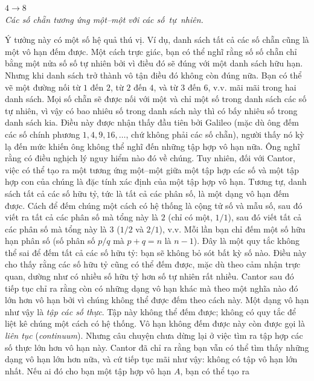 \begin{multicols}{2}
\begin{center}
		$4 \longrightarrow 8$\\
		\vskip 0.05cm
		\textit{\small\color{quantoan}Các số chẵn tương ứng một--một với các số~tự~nhiên.}
	\end{center}
	Ý tưởng này có một số hệ quả thú vị. Ví dụ, danh sách tất cả các số chẵn cũng
	là một vô hạn đếm được. Một cách trực giác, bạn có thể nghĩ rằng số số chẵn
	chỉ bằng một nửa số số tự nhiên bởi vì điều đó sẽ đúng với một danh sách hữu hạn.
	Nhưng khi danh sách trở thành vô tận điều đó không còn đúng nữa. Bạn có thể vẽ
	một đường nối từ $1$ đến $2$, từ $2$ đến $4$, và từ $3$ đến $6$, v.v. mãi
	mãi trong hai danh sách. Mọi số chẵn sẽ được nối với một và chỉ một số trong
	danh sách các số tự nhiên, vì vậy có bao nhiêu số trong danh sách này thì có
	bấy nhiêu 
	số trong danh sách kia. Điều này được nhận thấy đầu tiên bởi Galileo
	(mặc dù ông đếm các số chính phương $1, 4, 9, 16, \ldots$, chứ không phải các số
	chẵn), người thấy nó kỳ lạ đến mức khiến ông không thể nghĩ đến những tập
	hợp vô hạn nữa.  Ông nghĩ rằng có điều nghịch lý nguy hiểm nào đó về
	chúng. Tuy nhiên, đối với Cantor, việc có thể tạo ra một tương ứng một--một
	giữa một tập hợp các số và một tập hợp con của chúng là đặc tính xác định của
	một tập hợp vô hạn.
	\vskip 0.05cm 
	Tương tự, danh sách tất cả các số hữu tỷ, tức là tất cả các phân số, là một
	dạng vô hạn đếm được. Cách để đếm chúng một cách có hệ thống là cộng tử số và
	mẫu số, sau đó viết ra tất cả các phân số mà tổng này là $2$ (chỉ có một,
	$1/1$), sau đó viết tất cả các phân số mà tổng này là $3$ ($1/2$ và $2/1$),
	v.v. Mỗi lần bạn chỉ đếm một số hữu hạn phân số (số phân số $p / q$ mà
	$p + q = n$ là $n-1$). Đây là một quy tắc không thể sai để đếm tất cả các số
	hữu tỷ: bạn sẽ không bỏ sót bất kỳ số nào. Điều này cho thấy rằng các số hữu
	tỷ cũng có thể đếm được, mặc dù theo cảm nhận trực quan, dường như có nhiều
	số hữu tỷ hơn số tự nhiên rất nhiều.
	\vskip 0.05cm
	Cantor sau đó tiếp tục chỉ ra rằng còn có những dạng vô hạn khác mà theo một
	nghĩa nào đó lớn hơn vô hạn bởi vì chúng không thể được đếm theo cách này. Một
	dạng vô hạn như vậy là \emph{tập các số thực}. Tập này không thể đếm được; không có quy
	tắc để liệt kê chúng một cách có hệ thống. Vô hạn không đếm được này còn
	được gọi là \textit{liên tục} (\emph{continuum}).
	\vskip 0.05cm
	Nhưng câu chuyện chưa dừng lại ở việc tìm ra tập hợp các số thực lớn hơn vô
	hạn này. 
	Cantor đã chỉ ra rằng bạn vẫn có thể tìm thấy những dạng
	vô hạn lớn hơn nữa, và cứ tiếp tục mãi như vậy: không có tập vô hạn lớn nhất.
	Nếu ai đó cho bạn một tập hợp vô hạn $A$, bạn có thể tạo ra

\end{multicols}
